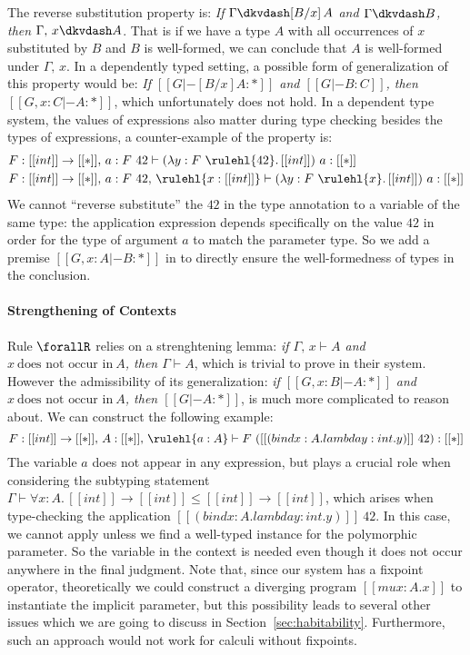 The reverse substitution property is:
\emph{If $\Gamma \dkvdash [B / x] \, A$ and $\Gamma \dkvdash B$, then $\Gamma,\, x \dkvdash A$}.
That is if we have a type $A$ with all occurrences of $x$ substituted by $B$ and $B$
is well-formed, we can conclude that $A$ is well-formed under $\Gamma,\, x$.
In a dependently typed setting, a possible form of generalization of this property
would be:
\emph{If $[[G |- [B / x] A : *]]$ and $[[G |- B : C]]$, then $[[G , x : C |- A : *]]$},
which unfortunately does not hold.
In a dependent type system, the values of expressions also matter during type checking
besides the types of expressions, a counter-example of the property is:
\begin{align*}
& F : [[int]] \rightarrow [[*]],\, a : F~42  \vdash (\lambda y : F~\rulehl{42}.\, [[int]]) ~ a : [[*]] \\
& F : [[int]] \rightarrow [[*]],\, a : F~42  ,\, \rulehl{x : [[int]]} \vdash (\lambda y : F~\rulehl{x}.\, [[int]]) ~ a : [[*]]
\end{align*}
We cannot ``reverse substitute'' the $42$ in the type annotation to a variable
of the same type: the application expression depends specifically on the value
$42$ in order for the type of argument $a$ to match the parameter type.
So we add a premise $[[G , x : A |- B : *]]$ in  to directly
ensure the well-formedness of types in the conclusion.

\paragraph*{Strengthening of Contexts}
\label{sec:strengthening}

Rule $\forallR$ relies on a strenghtening lemma:
\emph{if $\Gamma,\, x \vdash A$ and $x ~\text{does not occur in}~ A$, then $\Gamma \vdash A$}, which
is trivial to prove in their system.
However the admissibility of its generalization:
\emph{if $[[G, x : B |- A : *]]$ and $x ~\text{does not occur in}~ A$, then $[[G |- A : *]]$},
is much more complicated to reason about. We can construct the following example:
\begin{equation*}
    F : [[int]] \rightarrow [[*]],\, A : [[*]],\, \rulehl{a : A} \vdash F ~ ([[(bind x : A. lambda y : int. y)]]~ 42) : [[*]]
\end{equation*}
The variable $a$ does not appear in any expression, but plays a
crucial role when considering the subtyping statement
$\Gamma \vdash \forall x : A.\, [[int]] \rightarrow [[int]] \le [[int]] \rightarrow [[int]]$,
which arises when type-checking the application $[[(bind x : A. lambda y : int. y)]]~42$.
In this case, we cannot apply  unless we find a
well-typed instance for the polymorphic parameter. So the variable in the context
is needed even though it does not occur anywhere in the final judgment.
Note that, since our system has a fixpoint operator, theoretically we could construct
a diverging program $[[mu x : A. x]]$ to instantiate the implicit parameter, but
this possibility leads to several other issues which we are going to discuss in
Section~\ref{sec:habitability}. Furthermore, such an approach would not work for calculi
without fixpoints.

